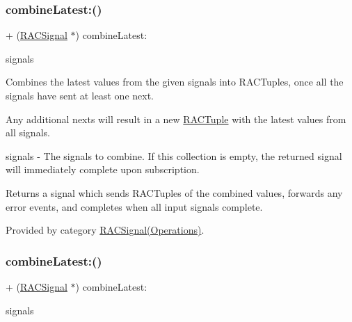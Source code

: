 \subsubsection{\texorpdfstring{combine\+Latest\+:()}{combineLatest:()}\hspace{0.1cm}{\footnotesize\ttfamily [1/3]}}
{\footnotesize\ttfamily + (\mbox{\hyperlink{interface_r_a_c_signal}{R\+A\+C\+Signal}} $\ast$) combine\+Latest\+: \begin{DoxyParamCaption}\item[{(id$<$N\+S\+Fast\+Enumeration$>$)}]{signals }\end{DoxyParamCaption}}

Combines the latest values from the given signals into R\+A\+C\+Tuples, once all the signals have sent at least one {\ttfamily next}.

Any additional {\ttfamily next}s will result in a new \mbox{\hyperlink{interface_r_a_c_tuple}{R\+A\+C\+Tuple}} with the latest values from all signals.

signals -\/ The signals to combine. If this collection is empty, the returned signal will immediately complete upon subscription.

Returns a signal which sends R\+A\+C\+Tuples of the combined values, forwards any {\ttfamily error} events, and completes when all input signals complete. 

Provided by category \mbox{\hyperlink{category_r_a_c_signal_07_operations_08_a8a7a563a48665fb1203e2b37db6e5e98}{R\+A\+C\+Signal(\+Operations)}}.

\mbox{\label{interface_r_a_c_signal_a8a7a563a48665fb1203e2b37db6e5e98}} 
\subsubsection{\texorpdfstring{combine\+Latest\+:()}{combineLatest:()}\hspace{0.1cm}{\footnotesize\ttfamily [2/3]}}
{\footnotesize\ttfamily + (\mbox{\hyperlink{interface_r_a_c_signal}{R\+A\+C\+Signal}} $\ast$) combine\+Latest\+: \begin{DoxyParamCaption}\item[{(id$<$ N\+S\+Fast\+Enumeration $>$)}]{signals }\end{DoxyParamCaption}}

